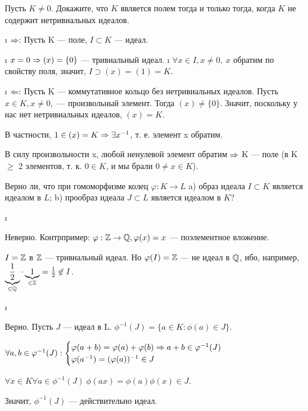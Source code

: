\begin{problem}[17(3.15)]
Пусть $K \neq 0$. Докажите, что $K$ является полем тогда и только тогда, когда $K$ не содержит нетривиальных идеалов.
\end{problem}

\begin{solution}

\begin{itemize}
\i
  \(\Rightarrow:\)
  Пусть K --- поле, \(I \subset K\) --- идеал.

  \begin{itemize}
  \tightlist
  \i
    \(x = 0 \Rightarrow (x) = \{0\}\) --- тривиальный идеал.
  \i
    \(\forall x \in I, x \ne 0, \ x\) обратим по свойству поля, значит, \(I \supset (x) = (1) = K\).
  \end{itemize}
\i
  \(\Leftarrow:\)
  Пусть K --- коммутативное кольцо без нетривиальных идеалов. Пусть \(x \in K, x \ne 0,\) --- произвольный элемент. Тогда \((x) \ne \{0\}\). Значит, поскольку у нас нет нетривиальных идеалов, \((x) = K\).

  В частности, \(1 \in (x) = K \Rightarrow \exists x^{-1}\), т. е. элемент x обратим.

  В силу произвольности x, любой ненулевой элемент обратим \(\Rightarrow\) K --- поле (в K \(\ge\) 2 элементов, т. к. \(0 \in K\), и мы брали \(0\ne x \in K\)).
\end{itemize}

\end{solution}

\begin{problem}[18(4.1)]
Верно ли, что при гомоморфизме колец $\varphi: K \to L$ 
a) образ идеала $I \subset K$ является идеалом в $L$; b) прообраз идеала $J \subset L$ является идеалом в $K$?
\end{problem}

\begin{enumerate}
\def\labelenumi{\alph{enumi})}
\i
  \begin{solution}
  Неверно. Контрпример: \(\varphi:\mathbb{Z} \to \mathbb{Q}, \varphi(x)=x\) --- поэлементное вложение.

  \(I=\mathbb{Z}\) в \(\mathbb{Z}\) --- тривиальный идеал. Но \(\varphi(I)=\mathbb{Z}\) --- не идеал в \(\mathbb{Q}\), ибо, например, \(\underbrace{\frac{1}{2}}_{\in \mathbb{Q}} \cdot \underbrace{1}_{\in \mathbb{Z}} = \frac{1}{2} \not\in I\).
  \end{solution}
\i
  \begin{solution}
  Верно. Пусть \(J\) --- идеал в L. \(\phi^{-1}(J) = \{a \in K : \phi(a) \in J\}\).

  \(\forall a, b \in \varphi^{-1}(J): \begin{cases} \varphi(a+b) = \varphi(a)+\varphi(b) \Rightarrow a+b \in \varphi^{-1}(J)\\ \varphi(a^{-1}) = (\varphi(a))^{-1} \in J \end{cases}\)

  \(\forall x \in K \forall a \in \phi^{-1}(J) \ \phi(ax)=\phi(a)\phi(x) \in J\).

  Значит, \(\phi^{-1}(J)\) --- действительно идеал.
  \end{solution}
\end{enumerate}

